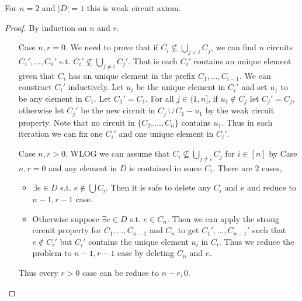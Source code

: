 For $n=2$ and $|D|=1$ this is weak circuit axiom.

\begin{proof}
    By induction on $n$ and $r$.
    \begin{itemize}
        \item[Case] $n,r=0$. We need to prove that if $C_i\not \subseteq \bigcup_{j<i}C_j$, we can find $n$ circuits $C_1',\ldots,C_n'$ s.t. $C_i'\not \subseteq \bigcup_{j\not=i}C_j'$. That is each $C_i'$ contains an unique element given that $C_i$ has an unique element in the prefix $C_1,\dots,C_{i-1}$. We can construct $C_i'$ inductively. Let $u_i$ be the unique element in $C_i'$ and set $u_1$ to be any element in $C_1$. Let $C_1'=C_1$. For all $j\in (1,n]$, if $u_1\notin C_j$ let $C_j'=C_j$, otherwise let $C_j'$ be the new circuit in $C_j\cup C_1-u_1$ by the weak circuit property. Note that no circuit in $\{C_2,\dots,C_n\}$ contains $u_1$. Thus in each iteration we can fix one $C_i'$ and one unique element in $C_i'$.
        \item[Case] $n,r>0$. WLOG we can assume that $C_i\not\subseteq \bigcup_{j\not=i}C_j$ for $i\in [n]$ by Case $n,r=0$ and any element in $D$ is contained in some $C_i$. There are 2 cases,
        \begin{itemize}
            \item $\exists e\in D$ s.t. $e\notin \bigcup C_i$. Then it is safe to delete any $C_i$ and $e$ and reduce to $n-1,r-1$ case.
            \item Otherwise suppose $\exists e\in D$ s.t. $e\in C_n$. Then we can apply the strong circuit property for $C_1,\dots,C_{n-1}$ and $C_n$ to get $C_1',\dots,C_{n-1}'$ such that $e\notin C_i'$ but $C_i'$ contains the unique element $u_i$ in $C_i$. Thus we reduce the problem to $n-1,r-1$ case by deleting $C_n$ and $e$.
        \end{itemize}
        Thus every $r>0$ case can be reduce to $n-r,0$.
    \end{itemize}
\end{proof}

